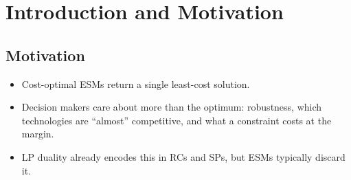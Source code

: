 \section{Introduction and Motivation}
\label{sec:introduction}

\subsection{Motivation}
\label{sec:motivation}
\begin{itemize}
	\item Cost-optimal \acp{ESM} return a single least-cost solution.
	\item Decision makers care about more than the optimum: robustness, which
	technologies are ``almost'' competitive, and what a constraint costs at the
	margin.
	\item LP duality already encodes this in \aclp{RC} and \aclp{SP}, but
	\acp{ESM} typically discard it.
\end{itemize}


